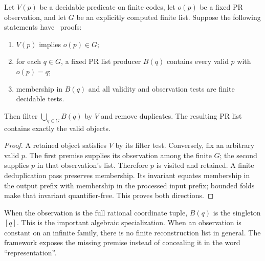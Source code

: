 \begin{proposition}\label{prop:reconstruction}
Let $V(p)$ be a decidable predicate on finite codes, let
$o(p)$ be a fixed PR observation, and let $G$ be an explicitly computed
finite list. Suppose the following statements have \ipra\ proofs:
\begin{enumerate}
\item $V(p)$ implies $o(p)\in G$;
\item for each $q\in G$, a fixed PR list producer $B(q)$ contains
every valid $p$ with $o(p)=q$;
\item membership in $B(q)$ and all validity and observation tests are
finite decidable tests.
\end{enumerate}
Then filter $\bigcup_{q\in G}B(q)$ by $V$ and remove duplicates.
The resulting PR list contains exactly the valid objects.
\end{proposition}
\begin{proof}
A retained object satisfies $V$ by its filter test. Conversely, fix an
arbitrary valid $p$. The first premise supplies its observation among
the finite $G$; the second supplies $p$ in that observation's list.
Therefore $p$ is visited and retained. A finite deduplication pass
preserves membership. Its invariant equates membership in the output
prefix with membership in the processed input prefix; bounded folds
make that invariant quantifier-free. This proves both directions.
\end{proof}

When the observation is the full rational coordinate tuple, $B(q)$
is the singleton $[q]$. This is the important algebraic specialization.
When an observation is constant on an infinite family, there is no
finite reconstruction list in general. The framework exposes the
missing premise instead of concealing it in the word ``representation''.
